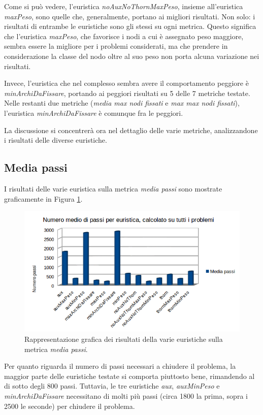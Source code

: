 Come si può vedere, l'euristica \textit{noAuxNoThornMaxPeso}, insieme all'euristica \textit{maxPeso}, sono quelle che, generalmente, portano ai migliori risultati. Non solo: i risultati di entrambe le euristiche sono gli stessi su ogni metrica. Questo significa che l'euristica \textit{maxPeso}, che favorisce i nodi a cui è assegnato peso maggiore, sembra essere la migliore per i problemi considerati, ma che prendere in considerazione la classe del nodo oltre al suo peso non porta alcuna variazione nei risultati.

Invece, l'euristica che nel complesso sembra avere il comportamento peggiore è \textit{minArchiDaFissare}, portando ai peggiori risultati su 5 delle 7 metriche testate. Nelle restanti due metriche (\textit{media max nodi fissati} e \textit{max max nodi fissati}), l'euristica \textit{minArchiDaFissare} è comunque fra le peggiori.

La discussione si concentrerà ora nel dettaglio delle varie metriche, analizzandone i risultati delle diverse euristiche.

\subsection{Media passi}
\label{subsec:mediaPassi}
I risultati delle varie euristica sulla metrica \textit{media passi} sono mostrate graficamente in Figura \ref{fig:mediaPassi}.

\begin{figure}[H]
\includegraphics[width=\textwidth]{res/img/mediaPassi.png}
\caption{Rappresentazione grafica dei risultati della varie euristiche sulla metrica \textit{media passi}.}
\label{fig:mediaPassi}
\end{figure}

Per quanto riguarda il numero di passi necessari a chiudere il problema, la maggior parte delle euristiche testate si comporta piuttosto bene, rimandendo al di sotto degli 800 passi. Tuttavia, le tre euristiche \textit{aux}, \textit{auxMinPeso} e \textit{minArchiDaFissare} necessitano di molti più passi (circa 1800 la prima, sopra i 2500 le seconde) per chiudere il problema.

